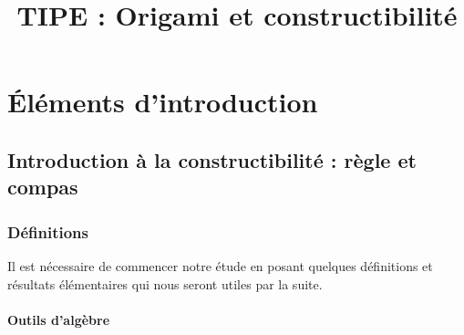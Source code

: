 \documentclass[a4paper,12pt,french]{report}
\title{TIPE : Origami et constructibilité}
\begin{document}
\newtheorem*{preuve}{Démonstration}
\maketitle
\renewcommand{\contentsname}{Sommaire}
\tableofcontents{}

\part{Éléments d'introduction}
\chapter{Introduction à la constructibilité : règle et compas}
	
	\section{Définitions}
		Il est nécessaire de commencer notre étude en posant quelques définitions et résultats élémentaires qui nous seront utiles par la suite.
		\subsection{Outils d'algèbre}
			
\end{document}

